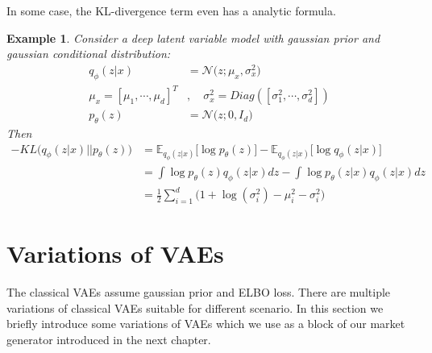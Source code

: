\documentclass[12pt]{report}
\newtheorem{example}[theorem]{Example}
\theoremstyle{definition}
\theoremstyle{remark}
\newcommand{\E}{\mathbb{E}}
\begin{document}
In some case, the KL-divergence term even has a analytic formula.
\begin{example}
  Consider a deep latent variable model with gaussian prior and gaussian conditional distribution:
  \begin{equation}
    \begin{split}
      q_{\phi}(z|x) &= \mathcal{N}\Big(z;\mu_{x},\sigma_{x}^{2}\Big)\\
      \mu_{x} = [\mu_{1},\cdots,\mu_{d}]^{T} &,\quad \sigma^{2}_{x} = Diag([\sigma^{2}_{1},\cdots,\sigma^{2}_{d}])\\
      p_{\theta}(z) &= \mathcal{N}\Big(z;0,I_{d}\Big)
    \end{split}
  \end{equation}
  Then 
  \begin{equation}
    \begin{split}
       -KL\big(q_{\phi}(z|x) \big|\big| p_{\theta}(z)\big) &= \E_{q_{\phi}(z|x)}\big[\log p_{\theta}(z)\big] - \E_{q_{\phi}(z|x)}\big[\log q_{\phi}(z|x)\big]\\
       &= \int \log p_{\theta}(z) q_{\phi}(z|x) dz - \int \log p_{\theta}(z|x) q_{\phi}(z|x) dz\\
       &= \frac{1}{2}\sum_{i=1}^{d}\Big(1 + \log(\sigma_{i}^{2}) - \mu_{i}^{2} - \sigma_{i}^{2}\Big)
    \end{split}
  \end{equation}
\end{example}

\section{Variations of VAEs}
The classical VAEs assume gaussian prior and ELBO loss. There are multiple variations of classical VAEs suitable for different scenario. In this section we briefly introduce some variations of VAEs which we use as a block of our market generator introduced in the next chapter.
\end{document}
